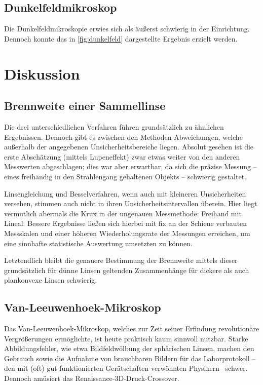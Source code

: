 \documentclass[english, ngerman]{scrartcl}
\begin{document}
\subsection{Dunkelfeldmikroskop}
\label{subsec:auswertung_dunkelfeldmikroskop}

Die Dunkelfeldmikroskopie erwies sich als äußerst schwierig in der Einrichtung. Dennoch konnte das in \autoref{fig:dunkelfeld} dargestellte Ergebnis erzielt werden.



\section{Diskussion}
\label{sec:diskussion}

\subsection{Brennweite einer Sammellinse}
\label{subsec:diskussion_sammellinse}

Die drei unterschiedlichen Verfahren führen grundsätzlich zu ähnlichen Ergebnissen. Dennoch gibt es zwischen den Methoden Abweichungen, welche außerhalb der angegebenen Unsicherheitsbereiche liegen. Absolut gesehen ist die erste Abschätzung (mittels Lupeneffekt) zwar etwas weiter von den anderen Messwerten abgeschlagen; dies war aber erwartbar, da sich die präzise Messung -- eines freihändig in den Strahlengang gehaltenen Objekts -- schwierig gestaltet.

Linsengleichung und Besselverfahren, wenn auch mit kleineren Unsicherheiten versehen, stimmen auch nicht in ihren Unsicherheitsintervallen überein. Hier liegt vermutlich abermals die Krux in der ungenauen Messmethode: Freihand mit Lineal. Bessere Ergebnisse ließen sich hierbei mit fix an der Schiene verbauten Messskalen und einer höheren Wiederholungsrate der Messungen erreichen, um eine sinnhafte statistische Auswertung umsetzten zu können.

Letztendlich bleibt die genauere Bestimmung der Brennweite mittels dieser grundsätzlich für dünne Linsen geltenden Zusammenhänge für dickere als auch plankonvexe Linsen schwierig.


\subsection{Van-Leeuwenhoek-Mikroskop}
\label{subsec:diskussion_Leeuwenhoek}

Das Van-Leeuwenhoek-Mikroskop, welches zur Zeit seiner Erfindung revolutionäre Vergrößerungen ermöglichte, ist heute praktisch kaum sinnvoll nutzbar. Starke Abbildungsfehler, wie etwa Bildfeldwölbung der sphärischen Linsen, machen den Gebrauch sowie die Aufnahme von brauchbaren Bildern für das Laborprotokoll -- den mit (oft) gut funktionierten Gerätschaften verwöhnten Physikern-- schwer. Dennoch amüsiert das Renaissance-3D-Druck-Crossover.
\end{document}
